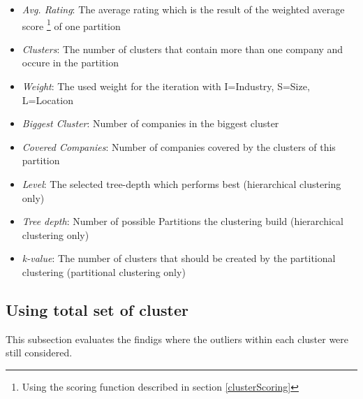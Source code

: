 \begin{itemize}
  \item \emph{Avg. Rating}: The average rating which is the result of the weighted average score
        \footnote{Using the scoring function described in section \ref{clusterScoring}} of one partition
  \item \emph{Clusters}: The number of clusters that contain more than one company and occure in the partition
  \item \emph{Weight}: The used weight for the iteration with I=Industry, S=Size, L=Location
  \item \emph{Biggest Cluster}: Number of companies in the biggest cluster
  \item \emph{Covered Companies}: Number of companies covered by the clusters of this partition
  \item \emph{Level}: The selected tree-depth which performs best (hierarchical clustering only)
  \item \emph{Tree depth}: Number of possible Partitions the clustering build (hierarchical clustering only)
  \item \emph{k-value}: The number of clusters that should be created by the partitional clustering (partitional clustering only)
\end{itemize}



\subsection{Using total set of cluster}
This subsection evaluates the findigs where the outliers within each cluster were still considered.

